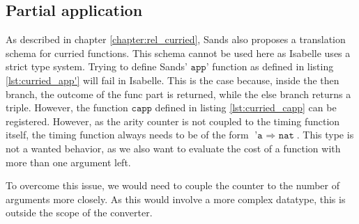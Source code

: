 \subsection{Partial application}
As described in chapter \ref{chapter:rel_curried}, Sands also proposes a translation schema for curried functions.
This schema cannot be used here as Isabelle uses a strict type system.
Trying to define Sands' $\texttt{app'}$ function as defined in listing \ref{lst:curried_app'} will fail in Isabelle.
This is the case because, inside the then branch, the outcome of the func part is returned, while the else branch returns a triple.
However, the function $\texttt{capp}$ defined in listing \ref{lst:curried_capp} can be registered.
However, as the arity counter is not coupled to the timing function itself, the timing function always needs to be of the form $\texttt{'a $\Rightarrow$ nat}$.
This type is not a wanted behavior, as we also want to evaluate the cost of a function with more than one argument left.

To overcome this issue, we would need to couple the counter to the number of arguments more closely.
As this would involve a more complex datatype, this is outside the scope of the converter.
